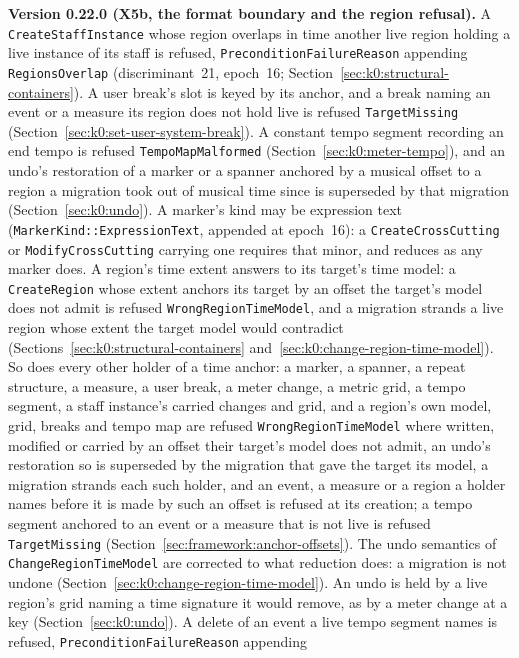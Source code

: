 \documentclass[11pt,letterpaper]{report}
\begin{document}
\noindent\textbf{Version 0.22.0 (X5b, the format boundary and the region
refusal).} A \texttt{CreateStaffInstance} whose region overlaps in time
another live region holding a live instance of its staff is refused,
\texttt{PreconditionFailureReason} appending \texttt{RegionsOverlap}
(discriminant~21, epoch~16; Section~\ref{sec:k0:structural-containers}).
A user break's slot is keyed by its anchor, and a break naming an event or a
measure its region does not hold live is refused \texttt{TargetMissing}
(Section~\ref{sec:k0:set-user-system-break}). A constant tempo segment
recording an end tempo is refused \texttt{TempoMapMalformed}
(Section~\ref{sec:k0:meter-tempo}), and an undo's restoration of a marker or
a spanner anchored by a musical offset to a region a migration took out of
musical time since is superseded by that migration
(Section~\ref{sec:k0:undo}). A marker's kind may be expression text
(\texttt{MarkerKind::ExpressionText}, appended at epoch~16): a
\texttt{CreateCrossCutting} or \texttt{ModifyCrossCutting} carrying one
requires that minor, and reduces as any marker does. A region's time extent
answers to its target's time model: a \texttt{CreateRegion} whose extent
anchors its target by an offset the target's model does not admit is refused
\texttt{WrongRegionTimeModel}, and a migration strands a live region whose
extent the target model would contradict
(Sections~\ref{sec:k0:structural-containers}
and~\ref{sec:k0:change-region-time-model}). So does every other holder of a
time anchor: a marker, a spanner, a repeat structure, a measure, a user break,
a meter change, a metric grid, a tempo segment, a staff instance's carried
changes and grid, and a region's own model, grid, breaks and tempo map are
refused \texttt{WrongRegionTimeModel} where written, modified or carried by an
offset their target's model does not admit, an undo's restoration so is
superseded by the migration that gave the target its model, a migration
strands each such holder, and an event, a measure or a region a holder names
before it is made by such an offset is refused at its creation; a tempo
segment anchored to an event or a measure that is not live is refused
\texttt{TargetMissing} (Section~\ref{sec:framework:anchor-offsets}). The
undo semantics of \texttt{ChangeRegionTimeModel} are corrected to what
reduction does: a migration is not undone
(Section~\ref{sec:k0:change-region-time-model}). An undo is held by a
live region's grid naming a time signature it would remove, as by a meter
change at a key (Section~\ref{sec:k0:undo}). A delete of an event a live
tempo segment names is refused, \texttt{PreconditionFailureReason} appending
\end{document}
